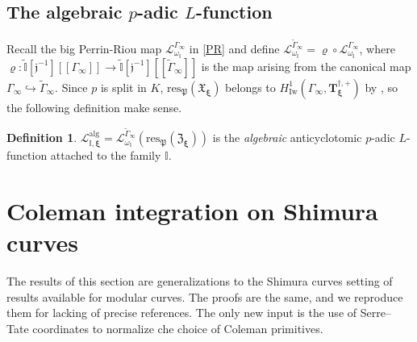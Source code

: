 \documentclass[a4paper,11pt]{amsart}
\numberwithin{equation}{section}
\theoremstyle{plain}
\theoremstyle{definition}
\newtheorem{definition}[theorem]{Definition}
\theoremstyle{remark}
\newcommand{\I}{\mathbb{I}}
\newcommand{\res}{\mathrm{res}}
\begin{document}
\subsection{The algebraic $p$-adic $L$-function}\label{sec8.3}
Recall the big Perrin-Riou map 
$\mathcal{L}^{{\Gamma}_\infty}_{\omega_{\I}}$ in \eqref{PR} 
and define 
$\mathcal{L}^{{\widetilde\Gamma}_\infty}_{\omega_{\I}}=\varrho\circ\mathcal{L}^{{\Gamma}_\infty}_{\omega_{\I}}$, where $\varrho\colon \widetilde{\I}[\mathfrak{j}^{-1}][[\Gamma_\infty]]\rightarrow \widetilde{\I}[\mathfrak{j}^{-1}][[\widetilde\Gamma_\infty]]$ is the map arising from the canonical map 
$\Gamma_\infty\hookrightarrow\widetilde{\Gamma}_\infty$. 
Since $p$ is split in $K$,
$\res_{\mathfrak{P}}(\mathfrak{X}_{\boldsymbol{\xi}})$ belongs to 
$H^1_\mathrm{Iw}(\Gamma_\infty,\mathbf{T}^{\dagger,+}_{\boldsymbol{\xi}})$ by \cite[Proposition 2.4.5]{Howard-Inv}, so the following definition make sense. 

\begin{definition}\label{geodef} 
${\mathscr{L}}_{\I,\boldsymbol{\xi}}^{\mathrm{alg}}=
\mathcal{L}^{{\widetilde\Gamma}_\infty}_{\omega_{\I}}\left(\res_\mathfrak{P}(\mathfrak{Z}_{\boldsymbol{\xi}})\right)$
is the \emph{algebraic} anticyclotomic $p$-adic $L$-function attached to the family $\I$.
\end{definition}

 
 \section{Coleman integration on Shimura curves} 

 The results of this section are generalizations to the Shimura curves setting of results available for modular curves. The proofs are the same, and we reproduce them for lacking of precise references. The only new input is the use of Serre--Tate coordinates to normalize che choice of Coleman primitives. 

 
\end{document}

